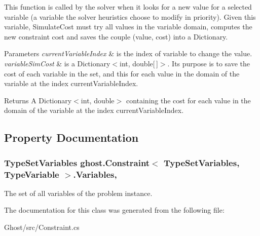 This function is called by the solver when it looks for a new value for a selected variable (a variable the solver heuristics choose to modify in priority). Given this variable, Simulate\-Cost must try all values in the variable domain, computes the new constraint cost and saves the couple (value, cost) into a Dictionary. 
\begin{DoxyParams}{Parameters}
{\em current\-Variable\-Index} & is the index of variable to change the value. \\
\hline
{\em variable\-Sim\-Cost} & is a Dictionary$<$int, double\mbox{[}$\,$\mbox{]}$>$. Its purpose is to save the cost of each variable in the set, and this for each value in the domain of the variable at the index current\-Variable\-Index. \\
\hline
\end{DoxyParams}
\begin{DoxyReturn}{Returns}
A Dictionary$<$int, double$>$ containing the cost for each value in the domain of the variable at the index current\-Variable\-Index. 
\end{DoxyReturn}


\subsection{Property Documentation}
\hypertarget{classghost_1_1Constraint_3_01TypeSetVariables_00_01TypeVariable_01_4_a22327beeea2a2d774f85477a9fdd7b55}{
\subsubsection[{Variables}]{\setlength{\rightskip}{0pt plus 5cm}Type\-Set\-Variables ghost.\-Constraint$<$ Type\-Set\-Variables, Type\-Variable $>$.Variables\hspace{0.3cm}{\ttfamily [get]}, {\ttfamily [set]}}}\label{classghost_1_1Constraint_3_01TypeSetVariables_00_01TypeVariable_01_4_a22327beeea2a2d774f85477a9fdd7b55}
The set of all variables of the problem instance. 

The documentation for this class was generated from the following file\-:\begin{DoxyCompactItemize}
\item 
Ghost/src/Constraint.\-cs\end{DoxyCompactItemize}
